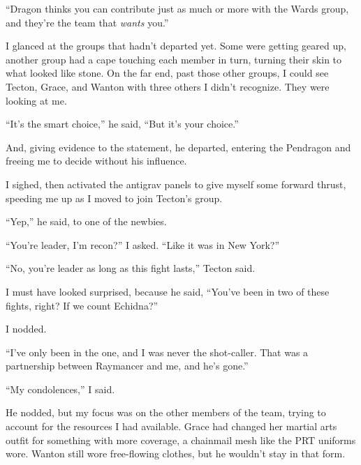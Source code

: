 ``Dragon thinks you can contribute just as much or more with the Wards group, and they're the team that \emph{wants} you.''



I glanced at the groups that hadn't departed yet.  Some were getting geared up, another group had a cape touching each member in turn, turning their skin to what looked like stone.  On the far end, past those other groups, I could see Tecton, Grace, and Wanton with three others I didn't recognize.  They were looking at me.



``It's the smart choice,'' he said, ``But it's your choice.''



And, giving evidence to the statement, he departed, entering the Pendragon and freeing me to decide without his influence.



I sighed, then activated the antigrav panels to give myself some forward thrust, speeding me up as I moved to join Tecton's group.



``Yep,'' he said, to one of the newbies.



``You're leader, I'm recon?'' I asked.  ``Like it was in New York?''



``No, you're leader as long as this fight lasts,'' Tecton said.



I must have looked surprised, because he said, ``You've been in two of these fights, right?  If we count Echidna?''



I nodded.



``I've only been in the one, and I was never the shot-caller.  That was a partnership between Raymancer and me, and he's gone.''



``My condolences,'' I said.



He nodded, but my focus was on the other members of the team, trying to account for the resources I had available.  Grace had changed her martial arts outfit for something with more coverage, a chainmail mesh like the PRT uniforms wore.  Wanton still wore free-flowing clothes, but he wouldn't stay in that form.



